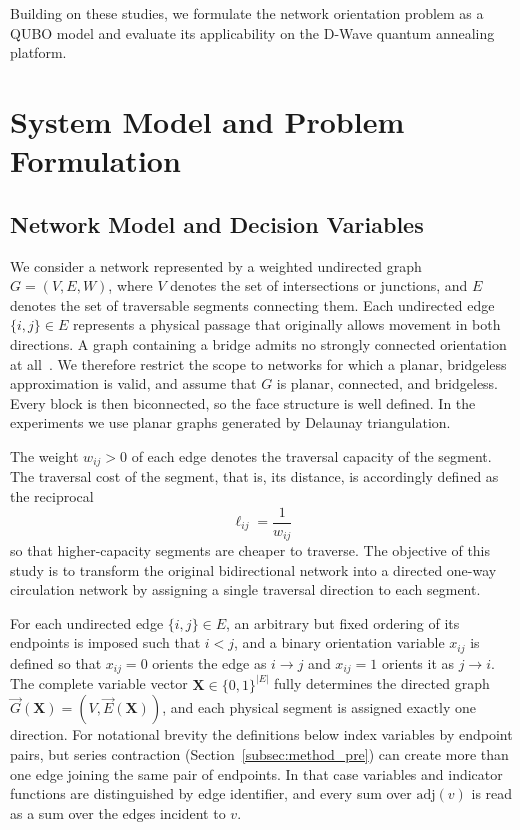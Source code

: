 \documentclass[twocolumn,a4paper]{article}
\begin{document}
Building on these studies, we formulate the network orientation problem as a QUBO model and evaluate its applicability on the D-Wave quantum annealing platform.

\section{System Model and Problem Formulation} \label{sec:model}

\subsection{Network Model and Decision Variables} \label{subsec:model_graph}

We consider a network represented by a weighted undirected graph $G=(V,E,W)$, where \(V\) denotes the set of intersections or junctions, and \(E\) denotes the set of traversable segments connecting them. Each undirected edge \(\{i,j\}\in E\) represents a physical passage that originally allows movement in both directions. A graph containing a bridge admits no strongly connected orientation at all~\cite{robbins1939theorem}. We therefore restrict the scope to networks for which a planar, bridgeless approximation is valid, and assume that \(G\) is planar, connected, and bridgeless. Every block is then biconnected, so the face structure is well defined. In the experiments we use planar graphs generated by Delaunay triangulation.

The weight \(w_{ij}>0\) of each edge denotes the traversal capacity of the segment. The traversal cost of the segment, that is, its distance, is accordingly defined as the reciprocal
\begin{equation}
    \ell_{ij}=\frac{1}{w_{ij}}
\end{equation}
so that higher-capacity segments are cheaper to traverse. The objective of this study is to transform the original bidirectional network into a directed one-way circulation network by assigning a single traversal direction to each segment.

For each undirected edge \(\{i,j\}\in E\), an arbitrary but fixed ordering of its endpoints is imposed such that \(i<j\), and a binary orientation variable \(x_{ij}\) is defined so that \(x_{ij}=0\) orients the edge as \(i\rightarrow j\) and \(x_{ij}=1\) orients it as \(j\rightarrow i\). The complete variable vector \(\mathbf{X}\in\{0,1\}^{|E|}\) fully determines the directed graph \(\vec{G}(\mathbf{X})=(V,\vec{E}(\mathbf{X}))\), and each physical segment is assigned exactly one direction. For notational brevity the definitions below index variables by endpoint pairs, but series contraction (Section~\ref{subsec:method_pre}) can create more than one edge joining the same pair of endpoints. In that case variables and indicator functions are distinguished by edge identifier, and every sum over \(\mathrm{adj}(v)\) is read as a sum over the edges incident to \(v\).
\end{document}
